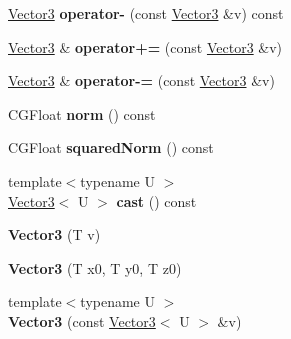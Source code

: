 \begin{DoxyCompactItemize}
\mbox{\label{struct_p_o_p_1_1_vector3_adba55fecd0a29f9303294cc2c938d464}} 
\mbox{\hyperlink{struct_p_o_p_1_1_vector3}{Vector3}} {\bfseries operator-\/} (const \mbox{\hyperlink{struct_p_o_p_1_1_vector3}{Vector3}} \&v) const
\item 
\mbox{\label{struct_p_o_p_1_1_vector3_adbe458c46e400d900fb31a4a0a72089a}} 
\mbox{\hyperlink{struct_p_o_p_1_1_vector3}{Vector3}} \& {\bfseries operator+=} (const \mbox{\hyperlink{struct_p_o_p_1_1_vector3}{Vector3}} \&v)
\item 
\mbox{\label{struct_p_o_p_1_1_vector3_a1411291a446e77833342100322d6e62a}} 
\mbox{\hyperlink{struct_p_o_p_1_1_vector3}{Vector3}} \& {\bfseries operator-\/=} (const \mbox{\hyperlink{struct_p_o_p_1_1_vector3}{Vector3}} \&v)
\item 
\mbox{\label{struct_p_o_p_1_1_vector3_afa3a458018b8f950720a0613a773b654}} 
C\+G\+Float {\bfseries norm} () const
\item 
\mbox{\label{struct_p_o_p_1_1_vector3_a84ed0d27242c193574281321b3000b69}} 
C\+G\+Float {\bfseries squared\+Norm} () const
\item 
\mbox{\label{struct_p_o_p_1_1_vector3_a4df7ae894c17da1bc8ac08b5cb58250b}} 
{\footnotesize template$<$typename U $>$ }\\\mbox{\hyperlink{struct_p_o_p_1_1_vector3}{Vector3}}$<$ U $>$ {\bfseries cast} () const
\item 
\mbox{\label{struct_p_o_p_1_1_vector3_aeb800855cd68d7e1e21d0a6b69d24af2}} 
{\bfseries Vector3} (T v)
\item 
\mbox{\label{struct_p_o_p_1_1_vector3_a7f9b798b03a28002bb70b8bbfd45b9f8}} 
{\bfseries Vector3} (T x0, T y0, T z0)
\item 
\mbox{\label{struct_p_o_p_1_1_vector3_a3645102b5769d81957530f6254eb9cb1}} 
{\footnotesize template$<$typename U $>$ }\\{\bfseries Vector3} (const \mbox{\hyperlink{struct_p_o_p_1_1_vector3}{Vector3}}$<$ U $>$ \&v)

\end{DoxyCompactItemize}
